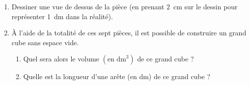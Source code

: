 \documentclass[exercice,a4]{thedocument}%
\begin{document}
\begin{enumerate}
\item Dessiner une vue de dessus de la pièce  (en prenant $2$~cm sur le dessin pour représenter
1~dm dans la réalité).
\item À l'aide de la totalité de ces sept pièces, il est possible de construire un grand cube sans espace vide.
	\begin{enumerate}
		\item Quel sera alors le volume $\left(\text{en dm}^3\right)$ de ce grand cube ?
		\item Quelle est la longueur d'une arête (en dm) de ce grand cube ?
	\end{enumerate}
\end{enumerate}

\showthesource
\end{document}
